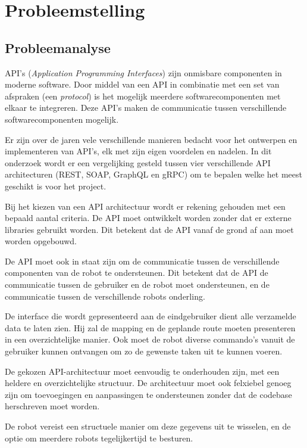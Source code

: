 \section{Probleemstelling}
\label{sec: Probleemstelling}

\subsection{Probleemanalyse}
\label{ssec:probleemanalyse}

API's (\textit{Application Programming Interfaces}) zijn onmisbare componenten in moderne
software. Door middel van een API in combinatie met een set van afspraken
(een \textit{protocol}) is het mogelijk meerdere softwarecomponenten met elkaar
te integreren. Deze API's maken de communicatie tussen verschillende
softwarecomponenten mogelijk.\cite{Souza_2012}

Er zijn over de jaren vele verschillende manieren bedacht voor het ontwerpen
en implementeren van API's, elk met zijn eigen voordelen en nadelen.
\cite{Śliwa_Pańczyk_2021} In dit onderzoek wordt er een vergelijking gesteld
tussen vier verschillende API architecturen (REST, SOAP, GraphQL en gRPC)
om te bepalen welke het meest geschikt is voor het project.

Bij het kiezen van een API architectuur wordt er rekening gehouden met een bepaald
aantal criteria. De API moet ontwikkelt worden zonder dat er externe libraries
gebruikt worden. Dit betekent dat de API vanaf de grond af aan moet worden opgebouwd.

De API moet ook in staat zijn om de communicatie tussen de verschillende componenten
van de robot te ondersteunen. Dit betekent dat de API de communicatie tussen de
gebruiker en de robot moet ondersteunen, en de communicatie tussen de verschillende
robots onderling.

De interface die wordt gepresenteerd aan de eindgebruiker dient alle verzamelde
data te laten zien. Hij zal de mapping en de geplande route moeten presenteren
in een overzichtelijke manier. Ook moet de robot diverse commando's vanuit de
gebruiker kunnen ontvangen om zo de gewenste taken uit te kunnen voeren.

De gekozen API-architectuur moet eenvoudig te onderhouden zijn, met een heldere
en overzichtelijke structuur. De architectuur moet ook felxiebel genoeg zijn
om toevoegingen en aanpassingen te ondersteunen zonder dat de codebase herschreven
moet worden.

De robot vereist een structuele manier om deze gegevens uit te wisselen, en
de optie om meerdere robots tegelijkertijd te besturen.


